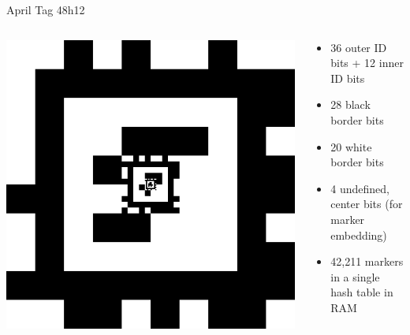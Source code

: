\documentclass[aspectratio=169]{beamer}
\begin{document}
\begin{frame}{April Tag 48h12}
	\begin{columns}
	\begin{column}{0.4\textwidth}
		\centering
		\includegraphics[width=\linewidth]{./images/tagCustom48h12_00002_00001_00000.png}
	\end{column}
	\begin{column}{0.6\textwidth}
	\begin{itemize}
		\item 36 outer ID bits + 12 inner ID bits
		\item 28 black border bits
		\item 20 white border bits
		\item 4 undefined, center bits (for marker embedding)
		\item 42,211 markers in a single hash table in RAM
	\end{itemize}
	\end{column}
	\end{columns}
\end{frame}
\end{document}
